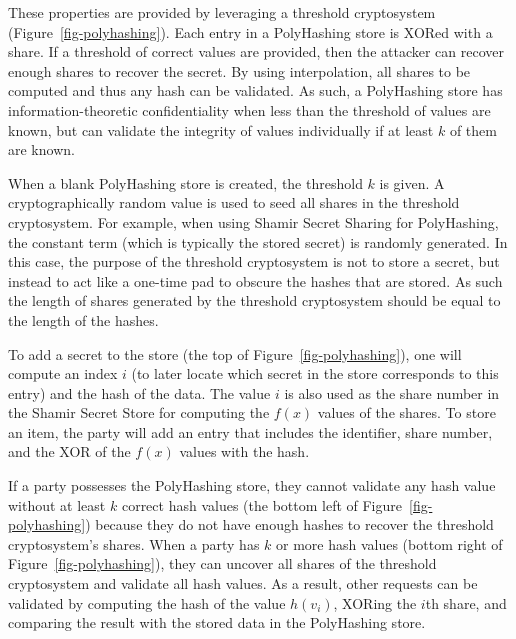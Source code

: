 These properties are provided by leveraging a threshold cryptosystem 
(Figure~\ref{fig-polyhashing}).   Each entry in a PolyHashing store is XORed 
with a share.   If a threshold of correct values are provided, then the 
attacker can recover enough shares to recover the secret.   By using
interpolation, all shares to be computed and thus any hash can be 
validated.  As such, a PolyHashing store has information-theoretic 
confidentiality when 
less than the threshold of values are known, but can validate the 
integrity of values individually if at least $k$ of them are known.


When a blank PolyHashing store is created, the threshold $k$ is given.  
A cryptographically random value is used to seed all shares in the
threshold cryptosystem.  For example, when using Shamir Secret Sharing for 
PolyHashing, the constant term (which is typically the stored secret) is 
randomly generated.   In this case, the purpose of the threshold cryptosystem 
is not to store a secret, but instead to act like a one-time pad to obscure 
the hashes that are stored.   As such the length of shares generated by 
the threshold cryptosystem should be equal to the length of the hashes.


To add a secret to the store (the top of Figure~\ref{fig-polyhashing}), one 
will compute an index $i$ (to 
later locate which secret in the store corresponds to this entry) and
the hash of the data.   The value $i$ is also used as the 
share number in the Shamir Secret Store for computing the $f(x)$ values of the
shares.   To store an item, the party will add an entry that includes the 
identifier, share number, and the XOR of the $f(x)$ values 
with the hash.   %



If a party possesses the PolyHashing store, they cannot validate any hash 
value without at least $k$ correct hash values (the bottom left of 
Figure~\ref{fig-polyhashing}) because they do not have enough hashes
to recover the threshold
cryptosystem's shares.  When a party has $k$ or more hash 
values (bottom right of Figure~\ref{fig-polyhashing}), they can 
uncover all shares of the threshold cryptosystem and validate all hash
values.   As a result, other requests can be validated by computing
the hash of the value $h(v_i)$, XORing the $i$th share, and
comparing the result with the stored data in the PolyHashing store.

